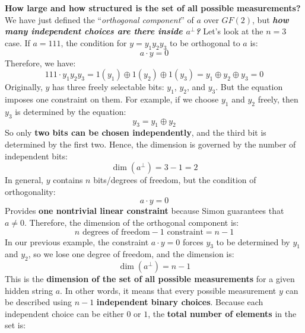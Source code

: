 \highspace
\textcolor{Green3}{ \textbf{How large and how structured is the set of all possible measurements?}} We have just defined the ``\emph{orthogonal component}'' of $a$ over $GF(2)$, but \textbf{\emph{how many independent choices are there inside $a^{\perp}$?}} Let's look at the $n=3$ case. If $a = 111$, the condition for $y = y_1 y_2 y_3$ to be orthogonal to $a$ is:
\begin{equation*}
    a \cdot y = 0
\end{equation*}
Therefore, we have:
\begin{equation*}
    111 \cdot y_1 y_2 y_3 = 1(y_1) \oplus 1(y_2) \oplus 1(y_3) = y_1 \oplus y_2 \oplus y_3 = 0
\end{equation*}
Originally, $y$ has three freely selectable bits: $y_1$, $y_2$, and $y_3$. But the equation imposes one constraint on them. For example, if we choose $y_1$ and $y_2$ freely, then $y_3$ is determined by the equation:
\begin{equation*}
    y_3 = y_1 \oplus y_2
\end{equation*}
So only \textbf{two bits can be chosen independently}, and the third bit is determined by the first two. Hence, the dimension is governed by the number of independent bits:
\begin{equation*}
    \dim\left(a^{\perp}\right) = 3 - 1 = 2
\end{equation*}
In general, $y$ contains $n$ bits/degrees of freedom, but the condition of orthogonality:
\begin{equation*}
    a \cdot y = 0
\end{equation*}
Provides \textbf{one nontrivial linear constraint} because Simon guarantees that $a \neq 0$. Therefore, the dimension of the orthogonal component is:
\begin{equation*}
    n \text{ degrees of freedom} - 1 \text{ constraint} = n - 1
\end{equation*}
In our previous example, the constraint $a \cdot y = 0$ forces $y_3$ to be determined by $y_1$ and $y_2$, so we lose one degree of freedom, and the dimension is:
\begin{equation}
    \dim\left(a^{\perp}\right) = n - 1
\end{equation}
This is the \textbf{dimension of the set of all possible measurements} for a given hidden string $a$. In other words, it means that every possible measurement $y$ can be described using $n-1$ \textbf{independent binary choices}. Because each independent choice can be either $0$ or $1$, the \textbf{total number of elements} in the set is:
